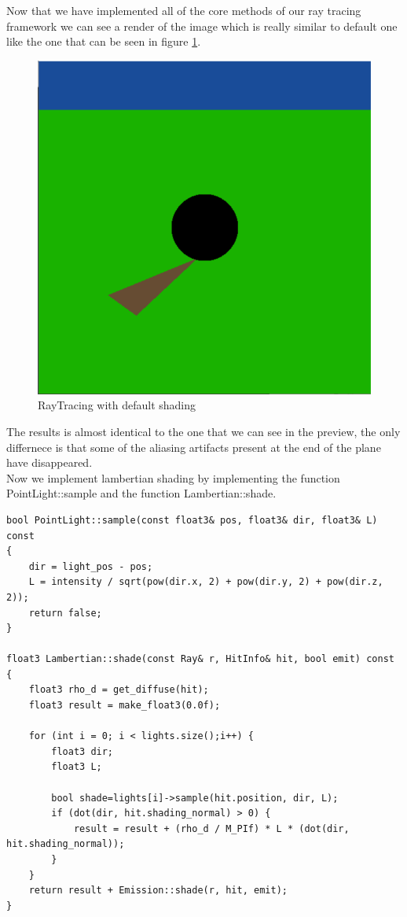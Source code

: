 Now that we have implemented all of the core methods of our ray tracing framework we can see a render of the image which is really similar to default one like the one that can be seen in figure \ref{fig:default_shading}.
\begin{figure}[H]
	\centering
	\includegraphics[scale=\imagescale]{images/worksheet_1/default_shading}
	\caption{RayTracing with default shading}
	\label{fig:default_shading}
\end{figure}
The results is almost identical to the one that we can see in the preview, the only differnece is that some of the aliasing artifacts present at the end of the plane have disappeared.\\
Now we implement lambertian shading by implementing the function PointLight::sample and the function Lambertian::shade. 
\begin{lstlisting}
bool PointLight::sample(const float3& pos, float3& dir, float3& L) const
{	
	dir = light_pos - pos;
	L = intensity / sqrt(pow(dir.x, 2) + pow(dir.y, 2) + pow(dir.z, 2));
	return false;
}

float3 Lambertian::shade(const Ray& r, HitInfo& hit, bool emit) const
{
	float3 rho_d = get_diffuse(hit);
	float3 result = make_float3(0.0f);

	for (int i = 0; i < lights.size();i++) {
		float3 dir;
		float3 L;
		
		bool shade=lights[i]->sample(hit.position, dir, L);
		if (dot(dir, hit.shading_normal) > 0) {
			result = result + (rho_d / M_PIf) * L * (dot(dir, hit.shading_normal));
		}
	}
	return result + Emission::shade(r, hit, emit);
}
\end{lstlisting}
